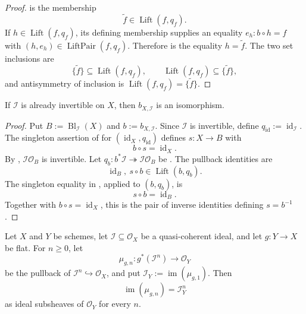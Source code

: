\begin{proof}
   is the membership
  \[
    \widetilde f\in\operatorname{Lift}(f,q_f).
  \]
  If $h\in\operatorname{Lift}(f,q_f)$, its defining membership supplies an
  equality $e_h\colon b\circ h=f$ with
  $(h,e_h)\in\operatorname{LiftPair}(f,q_f)$.  Therefore
   is the equality
  $h=\widetilde f$.  The two set inclusions are
  \[
    \{\widetilde f\}\subseteq\operatorname{Lift}(f,q_f),
    \qquad
    \operatorname{Lift}(f,q_f)\subseteq\{\widetilde f\},
  \]
  and antisymmetry of inclusion is
  $\operatorname{Lift}(f,q_f)=\{\widetilde f\}$.
\end{proof}

\begin{corollary}
  \label{cor:nagata-blowup-cartier-iso}
  \lean{}

  If $\mathcal I$ is already invertible on $X$, then
  $b_{X,\mathcal I}$ is an isomorphism.
\end{corollary}

\begin{proof}
  Put $B:=\operatorname{Bl}_{\mathcal I}(X)$ and $b:=b_{X,\mathcal I}$.
  Since $\mathcal I$ is invertible, define
  $q_{\operatorname{id}}:=\operatorname{id}_{\mathcal I}$.  The singleton
  assertion of  for
  $(\operatorname{id}_X,q_{\operatorname{id}})$ defines
  $s\colon X\to B$ with
  \[
    b\circ s=\operatorname{id}_X.
  \]
  By ,
  $\mathcal I\mathcal O_B$ is invertible.  Let
  $q_b\colon b^*\mathcal I\twoheadrightarrow\mathcal I\mathcal O_B$ be
  .  The pullback identities are
  \[
    \operatorname{id}_B,\ s\circ b\in\operatorname{Lift}(b,q_b).
  \]
  The singleton equality in
  , applied to $(b,q_b)$, is
  \[
    s\circ b=\operatorname{id}_B.
  \]
  Together with $b\circ s=\operatorname{id}_X$, this is the pair of inverse
  identities defining $s=b^{-1}$.
\end{proof}

\begin{lemma}
  \label{lemma:nagata-flat-pullback-ideal-pow}
  \lean{}

  Let $X$ and $Y$ be schemes, let
  $\mathcal I\subseteq\mathcal O_X$ be a quasi-coherent ideal, and let
  $g\colon Y\to X$ be flat.  For $n\ge0$, let
  \[
    \mu_{g,n}\colon g^*(\mathcal I^n)\longrightarrow\mathcal O_Y
  \]
  be the pullback of $\mathcal I^n\hookrightarrow\mathcal O_X$, and put
  $\mathcal I_Y:=\operatorname{im}(\mu_{g,1})$.  Then
  \[
    \operatorname{im}(\mu_{g,n})=\mathcal I_Y^n
  \]
  as ideal subsheaves of $\mathcal O_Y$ for every $n$.
\end{lemma}


